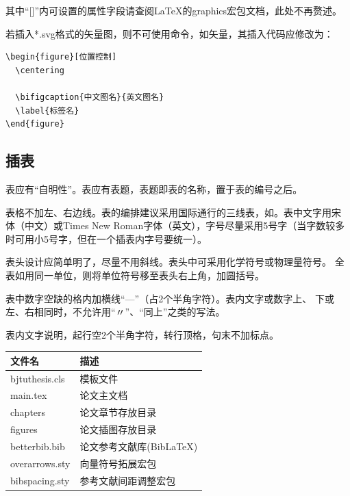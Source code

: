 \noindent 其中“[]”内可设置的属性字段请查阅\LaTeX{}的graphics宏包文档\cite{CP2024Packagesgraphi}，此处不再赘述。

若插入*.svg格式的矢量图，则不可使用命令，如矢量，其插入代码应修改为：

\begin{figure}[H]
  \centering
  
  \label{猪肉刺身杯}
\end{figure}

\begin{lstlisting}[language={[LaTeX]TeX}]
\begin{figure}[位置控制]
  \centering
  
  \bifigcaption{中文图名}{英文图名}
  \label{标签名}
\end{figure}
\end{lstlisting}

\subsection{插表}
表应有“自明性”。表应有表题，表题即表的名称，置于表的编号之后。

表格不加左、右边线。表的编排建议采用国际通行的三线表，如。表中文字用宋
体（中文）或Times New Roman字体（英文），字号尽量采用5号字（当字数较多
时可用小5号字，但在一个插表内字号要统一）。 

表头设计应简单明了，尽量不用斜线。表头中可采用化学符号或物理量符号。 
全表如用同一单位，则将单位符号移至表头右上角，加圆括号。

表中数字空缺的格内加横线“—”（占2个半角字符）。表内文字或数字上、
下或左、右相同时，不允许用“〃”、“同上”之类的写法。 

表内文字说明，起行空2个半角字符，转行顶格，句末不加标点。

\begin{table}[H]\wuhao
  \centering
  \renewcommand\arraystretch{0.8} %
  \begin{tabular}{ll}
    \toprule
    文件名          & 描述                         \\
    \midrule
    bjtuthesis.cls   & 模板文件                     \\
    main.tex & 论文主文档    \\
    chapters & 论文章节存放目录  \\
    figures & 论文插图存放目录        \\
    betterbib.bib & 论文参考文献库(BibLaTeX)        \\
    overarrows.sty & 向量符号拓展宏包    \\
    bibspacing.sty & 参考文献间距调整宏包  \\
    \bottomrule
  \end{tabular}
  \label{tab:eg1}
\end{table}

